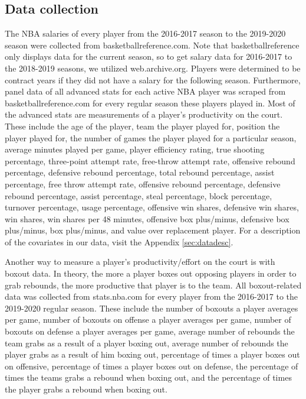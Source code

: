 \documentclass[12pt]{article}
\begin{document}
	\subsection{Data collection}
	
	The NBA salaries of every player from the 2016-2017 season to the 2019-2020 season were collected from basketballreference.com. Note that basketballreference only displays data for the current season, so to get salary data for 2016-2017 to the 2018-2019 seasons, we utilized web.archive.org. Players were determined to be contract years if they did not have a salary for the following season. Furthermore, panel data of all advanced stats for each active NBA player was scraped from basketballreference.com for every regular season these players played in. Most of the advanced stats are measurements of a player's productivity on the court. These include the age of the player, team the player played for, position the player played for, the number of games the player played for a particular season, average minutes played per game, player efficiency rating, true shooting percentage, three-point attempt rate, free-throw attempt rate, offensive rebound percentage, defensive rebound percentage, total rebound percentage, assist percentage, free throw attempt rate, offensive rebound percentage, defensive rebound percentage, assist percentage, steal percentage, block percentage, turnover percentage, usage percentage, offensive win shares, defensive win shares, win shares, win shares per 48 minutes, offensive box plus/minus, defensive box plus/minus, box plus/minus, and value over replacement player. For a description of the covariates in our data, visit the Appendix \ref{sec:datadesc}.
	
	Another way to measure a player's productivity/effort on the court is with boxout data. In theory, the more a player boxes out opposing players in order to grab rebounds, the more productive that player is to the team. All boxout-related data was collected from stats.nba.com for every player from the 2016-2017 to the 2019-2020 regular season. These include the number of boxouts a player averages per game, number of boxouts on offense a player averages per game, number of boxouts on defense a player averages per game, average number of rebounds the team grabs as a result of a player boxing out, average number of rebounds the player grabs as a result of him boxing out, percentage of times a player boxes out on offensive, percentage of times a player boxes out on defense, the percentage of times the teams grabs a rebound when boxing out, and the percentage of times the player grabs a rebound when boxing out. 
	
\end{document}
